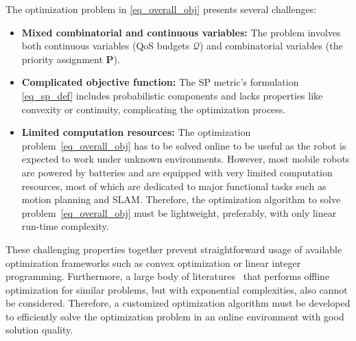     The optimization problem in \eqref{eq_overall_obj} presents several challenges:
\begin{itemize}
    \item \textbf{Mixed combinatorial and continuous variables:} The problem involves both continuous variables (QoS budgets $\boldsymbol{\mathcal{Q}}$) and combinatorial variables (the priority assignment $\boldsymbol{P}$).
    \item \textbf{Complicated objective function:} The SP metric's formulation \eqref{eq_sp_def} includes probabilistic components and lacks properties like convexity or continuity, complicating the optimization process.
    \item \textbf{Limited computation resources:} The optimization problem~\eqref{eq_overall_obj} has to be solved online to be useful as the robot is expected to work under unknown environments.
    However, most mobile robots are powered by batteries and are equipped with very limited computation resources, most of which are dedicated to major functional tasks such as motion planning and SLAM.
    Therefore, the optimization algorithm to solve problem~\eqref{eq_overall_obj} must be lightweight, preferably, with only linear run-time complexity.
\end{itemize}
    These challenging properties together prevent straightforward usage of available optimization frameworks such as convex optimization or linear integer programming.
    Furthermore, a large body of literatures~\cite{zhao2018unified, Wang2023OptimizingLET, Verucchi2020LatencyAwareGO} that performs offline optimization for similar problems, but with exponential complexities, also cannot be considered.
    Therefore, a customized optimization algorithm must be developed to efficiently solve the optimization problem in an online environment with good solution quality.

